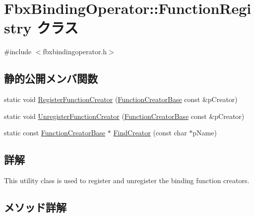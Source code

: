 \hypertarget{class_fbx_binding_operator_1_1_function_registry}{}\section{Fbx\+Binding\+Operator\+:\+:Function\+Registry クラス}
\label{class_fbx_binding_operator_1_1_function_registry}


{\ttfamily \#include $<$fbxbindingoperator.\+h$>$}

\subsection*{静的公開メンバ関数}
\begin{DoxyCompactItemize}
\item 
static void \hyperlink{class_fbx_binding_operator_1_1_function_registry_a5ecec300a953a369fb892a46a362e384}{Register\+Function\+Creator} (\hyperlink{class_fbx_binding_operator_1_1_function_creator_base}{Function\+Creator\+Base} const \&p\+Creator)
\item 
static void \hyperlink{class_fbx_binding_operator_1_1_function_registry_a8395c776992e40df9639032984dcc094}{Unregister\+Function\+Creator} (\hyperlink{class_fbx_binding_operator_1_1_function_creator_base}{Function\+Creator\+Base} const \&p\+Creator)
\item 
static const \hyperlink{class_fbx_binding_operator_1_1_function_creator_base}{Function\+Creator\+Base} $\ast$ \hyperlink{class_fbx_binding_operator_1_1_function_registry_af7d48205eac024266e04018d181b92d0}{Find\+Creator} (const char $\ast$p\+Name)
\end{DoxyCompactItemize}


\subsection{詳解}
This utility class is used to register and unregister the binding function creators. 

\subsection{メソッド詳解}
\mbox{\label{class_fbx_binding_operator_1_1_function_registry_af7d48205eac024266e04018d181b92d0}} 
